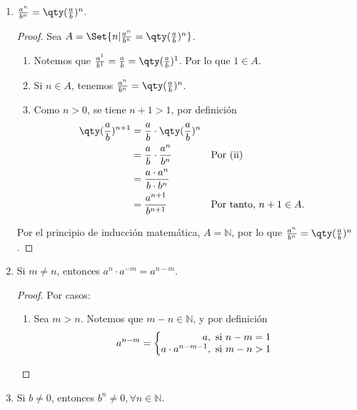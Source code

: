 \documentclass[11pt]{article}
\newcommand{\N}{\mathbb{N}}
\let\set\Set
\begin{document}
\begin{enumerate}[label=\alph*)]
    \item $\frac{a^n}{b^n}= \qty(\frac{a}{b})^n$.
    \vspace{-1em}
    \begin{proof}
    Sea $A=\set{n|\frac{a^n}{b^n}= \qty(\frac{a}{b})^n}$.\begin{enumerate}[label=\roman*)]
    \item Notemos que $\frac{a^1}{b^1}= \frac{a}{b}= \qty(\frac{a}{b})^1$. Por lo que $1\in A$.
    \item Si $n\in A$, tenemos $\frac{a^n}{b^n}= \qty(\frac{a}{b})^n$.
    \item Como $n>0$, se tiene $n+1>1$, por definición \vspace{1em}\begin{align*}
            \qty(\frac{a}{b})^{n+1} &= \frac{a}{b}\cdot \qty(\frac{a}{b})^n\\
            &=\frac{a}{b}\cdot \frac{a^n}{b^n} && \text{Por (ii)}\\
            &= \frac{a\cdot a^n}{b\cdot b^n}\\
            &= \frac{a^{n+1}}{b^{n+1}} && \text{Por tanto, $n+1\in A$.}
        \end{align*}\vspace{-2em}
    \end{enumerate}\vspace{1em}
    Por el principio de inducción matemática, $A=\N$, por lo que $\frac{a^n}{b^n}= \qty(\frac{a}{b})^n$.
    \end{proof} \vspace{-1em}

    \item Si $m\neq n$, entonces $a^n\cdot a^{-m} = a^{n-m}$.
    \vspace{-1em}
    \begin{proof}
    Por casos: \vspace{-1em}\begin{enumerate}[label=\roman*)]
    \item Sea $m>n$. Notemos que $m-n\in \N$, y por definición \vspace{1em}\begin{align*}
        a^{n-m} = \left\{
            \begin{array}{@{}r@{\thinspace}l}
                a, &  \ \text{si}  \ n-m = 1\\
                a\cdot a^{n-m-1}, &  \ \text{si}  \ m-n > 1
            \end{array} \right.
        \end{align*}\vspace{-1em}
    \end{enumerate}\vspace{-1em}
    \end{proof} \vspace{-1em}

    \item Si $b\neq 0$, entonces $b^n \neq 0, \forall n\in \N$.

\end{enumerate}
\end{document}
